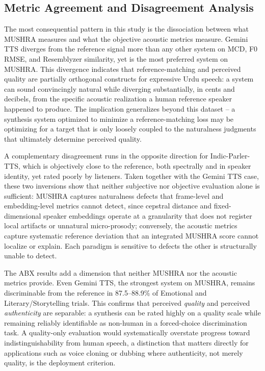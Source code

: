 \documentclass[a4paper,fleqn]{cas-dc}
\begin{document}
    \subsection{Metric Agreement and Disagreement Analysis}\label{sec:discussion-agreement}
    
    \hspace*{1.2em} The most consequential pattern in this study is the dissociation between what MUSHRA measures and what the objective acoustic metrics measure. Gemini TTS diverges from the reference signal more than any other system on MCD, F0 RMSE, and Resemblyzer similarity, yet is the most preferred system on MUSHRA. This divergence indicates that reference-matching and perceived quality are partially orthogonal constructs for expressive Urdu speech: a system can sound convincingly natural while diverging substantially, in cents and decibels, from the specific acoustic realization a human reference speaker happened to produce. The implication generalizes beyond this dataset -- a synthesis system optimized to minimize a reference-matching loss may be optimizing for a target that is only loosely coupled to the naturalness judgments that ultimately determine perceived quality.
    
    \hspace*{1.2em} A complementary disagreement runs in the opposite direction for Indic-Parler-TTS, which is objectively close to the reference, both spectrally and in speaker identity, yet rated poorly by listeners. Taken together with the Gemini TTS case, these two inversions show that neither subjective nor objective evaluation alone is sufficient: MUSHRA captures naturalness defects that frame-level and embedding-level metrics cannot detect, since cepstral distance and fixed-dimensional speaker embeddings operate at a granularity that does not register local artifacts or unnatural micro-prosody; conversely, the acoustic metrics capture systematic reference deviation that an integrated MUSHRA score cannot localize or explain. Each paradigm is sensitive to defects the other is structurally unable to detect.
    
    \hspace*{1.2em} The ABX results add a dimension that neither MUSHRA nor the acoustic metrics provide. Even Gemini TTS, the strongest system on MUSHRA, remains discriminable from the reference in 87.5--88.9\% of Emotional and
    Literary/Storytelling trials. This confirms that perceived
    \textit{quality} and perceived \textit{authenticity} are separable: a
    synthesis can be rated highly on a quality scale while remaining reliably
    identifiable as non-human in a forced-choice discrimination task. A
    quality-only evaluation would systematically overstate progress toward
    indistinguishability from human speech, a distinction that matters
    directly for applications such as voice cloning or dubbing where
    authenticity, not merely quality, is the deployment criterion.
\end{document}
